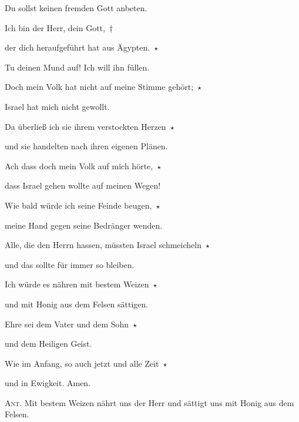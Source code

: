 Du sollst keinen fremden Gott anbeten.

\noindent Ich bin der Herr, dein Gott,~†~\nopagebreak

der dich heraufgeführt hat aus Ägypten.~$\star$~\nopagebreak

Tu deinen Mund auf! Ich will ihn füllen.

\noindent Doch mein Volk hat nicht auf meine Stimme gehört;~$\star$~\nopagebreak

Israel hat mich nicht gewollt.

\noindent Da überließ ich sie ihrem verstockten Herzen~$\star$~\nopagebreak

und sie handelten nach ihren eigenen Plänen. 

\noindent Ach dass doch mein Volk auf mich hörte,~$\star$~\nopagebreak

dass Israel gehen wollte auf meinen Wegen!

\noindent Wie bald würde ich seine Feinde beugen,~$\star$~\nopagebreak

meine Hand gegen seine Bedränger wenden. 

\noindent Alle, die den Herrn hassen, müssten Israel schmeicheln~$\star$~\nopagebreak

und das sollte für immer so bleiben. 

\noindent Ich würde es nähren mit bestem Weizen~$\star$~\nopagebreak

und mit Honig aus dem Felsen sättigen.

\noindent Ehre sei dem Vater und dem Sohn~$\star$~\nopagebreak

und dem Heiligen Geist.

\noindent Wie im Anfang, so auch jetzt und alle Zeit~$\star$~\nopagebreak

und in Ewigkeit. Amen.

\vspace{10pt}

\noindent \textsc{Ant.} Mit bestem Weizen nährt uns der Herr und sättigt uns mit Honig aus dem Felsen.